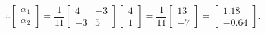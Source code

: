 \documentclass[letterpaper]{article}
\begin{document}
$$\therefore \begin{bmatrix} \alpha_1 \\ \alpha_2 \end{bmatrix} = \frac{1}{11}\left[\begin{array}{cc} 4 & -3 \\ -3 & 5 \end{array}\right] \begin{bmatrix} 4 \\ 1\end{bmatrix} = \frac{1}{11} \begin{bmatrix} 13 \\ -7 \end{bmatrix} = \begin{bmatrix} 1.18 \\ -0.64 \end{bmatrix}.$$
\end{document}
